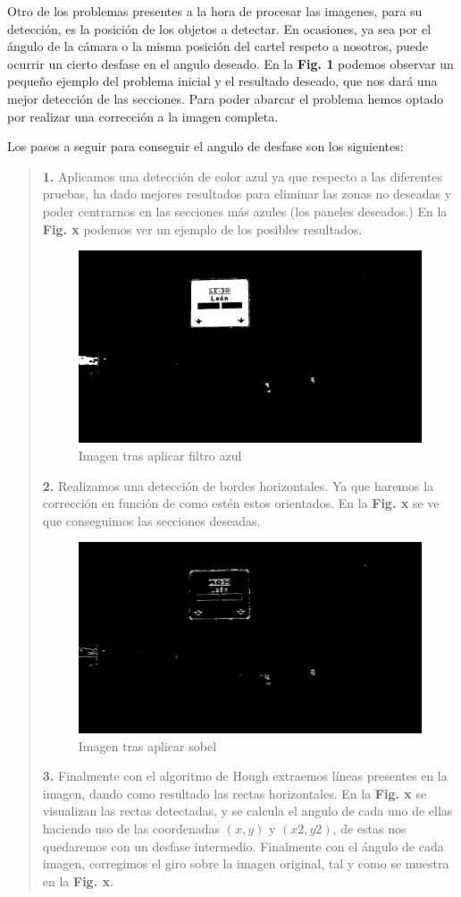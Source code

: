 \documentclass[a4paper, 12pt]{article}
\begin{document}
Otro de los problemas presentes a la hora de procesar las imagenes, para su detección, es la posición de los objetos a detectar. En ocasiones, ya sea por el ángulo de la cámara o la misma posición del cartel respeto a nosotros, puede ocurrir un cierto desfase en el angulo deseado. En la \textbf{Fig. 1} podemos observar un pequeño ejemplo del problema inicial y el resultado deseado, que nos dará una mejor detección de las secciones. Para poder abarcar el problema hemos optado por realizar una corrección a la imagen completa. 

Los pasos a seguir para conseguir el angulo de desfase son los siguientes:



\begin{quote}
	\textbf{1.} Aplicamos una detección de color azul ya que respecto a las diferentes pruebas, ha dado mejores resultados para eliminar las zonas no deseadas y poder centrarnos en las secciones más azules (los paneles deseados.) En la \textbf{Fig. x} podemos ver un ejemplo de los posibles resultados.
	\begin{figure}[h]
		\centering
		\includegraphics[width=0.6\linewidth]{img/image_blue_f}
		\caption{Imagen tras aplicar filtro azul}
		\label{fig:imagebluef}
	\end{figure}
	
	\textbf{2.} Realizamos una detección de bordes horizontales. Ya que haremos la corrección en función de como estén estos orientados. En la \textbf{Fig. x} se ve que conseguimos las secciones deseadas.
	
	\begin{figure}[h]
		\centering
		\includegraphics[width=0.6\linewidth]{img/image_boder_h}
		\caption{Imagen tras aplicar sobel}
		\label{fig:imageboderh}
	\end{figure}
	\textbf{3.} Finalmente con el algoritmo de Hough extraemos líneas presentes en la imagen, dando como resultado las rectas horizontales. En la \textbf{Fig. x} se visualizan las rectas detectadas, y se calcula el angulo de cada uno de ellas haciendo uso de las coordenadas $(x, y)$ y $(x2, y2)$, de estas nos quedaremos con un desfase intermedio. Finalmente con el ángulo de cada imagen, corregimos el giro sobre la imagen original, tal y como se muestra en la \textbf{Fig. x}.
	

\end{quote}
\end{document}
